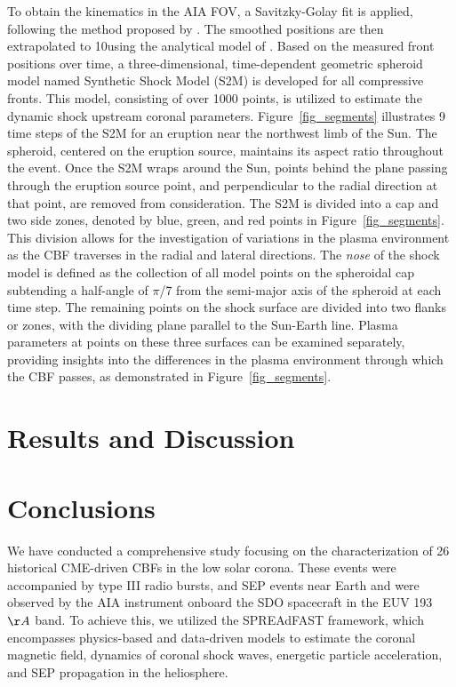 To obtain the kinematics in the AIA FOV, a Savitzky-Golay fit is applied, following the method proposed by \citet{kozarev_2019}. The smoothed positions are then extrapolated to 10\rsun using the analytical model of \citet{byrne_2013}. Based on the measured front positions over time, a three-dimensional, time-dependent geometric spheroid model named Synthetic Shock Model (S2M) is developed for all compressive fronts. This model, consisting of over 1000 points, is utilized to estimate the dynamic shock upstream coronal parameters. Figure~\ref{fig_segments} illustrates 9 time steps of the S2M for an eruption near the northwest limb of the Sun.
The spheroid, centered on the eruption source, maintains its aspect ratio throughout the event. Once the S2M wraps around the Sun, points behind the plane passing through the eruption source point, and perpendicular to the radial direction at that point, are removed from consideration. The S2M is divided into a cap and two side zones, denoted by blue, green, and red points in Figure~\ref{fig_segments}. This division allows for the investigation of variations in the plasma environment as the CBF traverses in the radial and lateral directions.
The \textit{nose} of the shock model is defined as the collection of all model points on the spheroidal cap subtending a half-angle of $\pi$/7 from the semi-major axis of the spheroid at each time step. The remaining points on the shock surface are divided into two flanks or zones, with the dividing plane parallel to the Sun-Earth line. Plasma parameters at points on these three surfaces can be examined separately, providing insights into the differences in the plasma environment through which the CBF passes, as demonstrated in Figure~\ref{fig_segments}.




\section{Results and Discussion}





\section{Conclusions}
We have conducted a comprehensive study focusing on the characterization of 26 historical CME-driven CBFs in the low solar corona. These events were accompanied by type III radio bursts, and SEP events near Earth and were observed by the AIA instrument onboard the SDO spacecraft in the EUV 193 $\AA$ band. To achieve this, we utilized the SPREAdFAST framework, which encompasses physics-based and data-driven models to estimate the coronal magnetic field, dynamics of coronal shock waves, energetic particle acceleration, and SEP propagation in the heliosphere.

